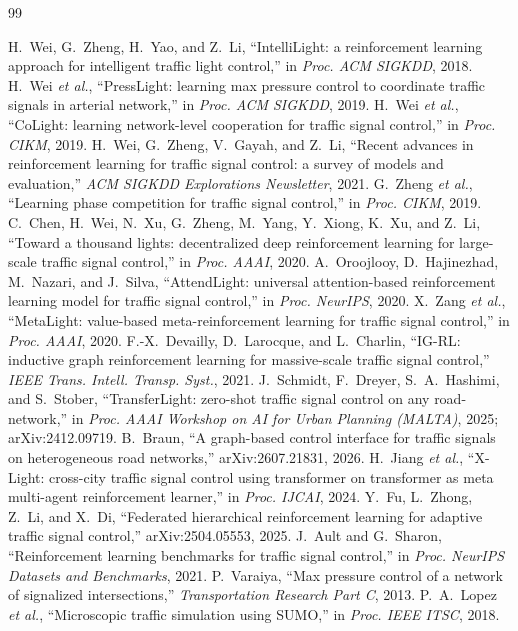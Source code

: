 \documentclass[conference]{IEEEtran}
\begin{document}
\begin{thebibliography}{99}
\scriptsize\setlength{\itemsep}{0pt}\setlength{\parskip}{0pt}

 H.~Wei, G.~Zheng, H.~Yao, and Z.~Li, ``IntelliLight: a
reinforcement learning approach for intelligent traffic light control,'' in
\emph{Proc. ACM SIGKDD}, 2018.
 H.~Wei \emph{et al.}, ``PressLight: learning max pressure
control to coordinate traffic signals in arterial network,'' in \emph{Proc. ACM
SIGKDD}, 2019.
 H.~Wei \emph{et al.}, ``CoLight: learning network-level
cooperation for traffic signal control,'' in \emph{Proc. CIKM}, 2019.
 H.~Wei, G.~Zheng, V.~Gayah, and Z.~Li, ``Recent advances in
reinforcement learning for traffic signal control: a survey of models and
evaluation,'' \emph{ACM SIGKDD Explorations Newsletter}, 2021.
 G.~Zheng \emph{et al.}, ``Learning phase competition for traffic
signal control,'' in \emph{Proc. CIKM}, 2019.
 C.~Chen, H.~Wei, N.~Xu, G.~Zheng, M.~Yang, Y.~Xiong, K.~Xu, and
Z.~Li, ``Toward a thousand lights: decentralized deep reinforcement learning for
large-scale traffic signal control,'' in \emph{Proc. AAAI}, 2020.
 A.~Oroojlooy, D.~Hajinezhad, M.~Nazari, and J.~Silva,
``AttendLight: universal attention-based reinforcement learning model for traffic
signal control,'' in \emph{Proc. NeurIPS}, 2020.
 X.~Zang \emph{et al.}, ``MetaLight: value-based
meta-reinforcement learning for traffic signal control,'' in \emph{Proc. AAAI},
2020.
 F.-X.~Devailly, D.~Larocque, and L.~Charlin, ``IG-RL: inductive
graph reinforcement learning for massive-scale traffic signal control,''
\emph{IEEE Trans. Intell. Transp. Syst.}, 2021.
 J.~Schmidt, F.~Dreyer, S.~A.~Hashimi, and S.~Stober,
``TransferLight: zero-shot traffic signal control on any road-network,'' in
\emph{Proc. AAAI Workshop on AI for Urban Planning (MALTA)}, 2025;
arXiv:2412.09719.
 B.~Braun, ``A graph-based control interface for traffic
signals on heterogeneous road networks,'' arXiv:2607.21831, 2026.
 H.~Jiang \emph{et al.}, ``X-Light: cross-city traffic signal
control using transformer on transformer as meta multi-agent reinforcement
learner,'' in \emph{Proc. IJCAI}, 2024.
 Y.~Fu, L.~Zhong, Z.~Li, and X.~Di, ``Federated hierarchical
reinforcement learning for adaptive traffic signal control,'' arXiv:2504.05553,
2025.
 J.~Ault and G.~Sharon, ``Reinforcement learning benchmarks for
traffic signal control,'' in \emph{Proc. NeurIPS Datasets and Benchmarks}, 2021.
 P.~Varaiya, ``Max pressure control of a network of signalized
intersections,'' \emph{Transportation Research Part C}, 2013.
 P.~A.~Lopez \emph{et al.}, ``Microscopic traffic simulation using
SUMO,'' in \emph{Proc. IEEE ITSC}, 2018.


\end{thebibliography}
\end{document}
